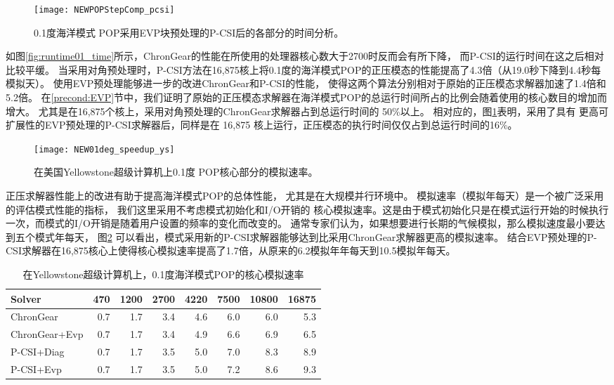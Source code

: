 \begin {figure}[!h]
\centering
\texttt{[image: NEWPOPStepComp\_pcsi]}
\caption[] { 0.1度海洋模式 POP采用EVP块预处理的P-CSI后的各部分的时间分析。 \label{fig:StepComp_pcsi}}
\end{figure}

如图\ref{fig:runtime01_time}所示，ChronGear的性能在所使用的处理器核心数大于2700时反而会有所下降，
而P-CSI的运行时间在这之后相对比较平缓。 
当采用对角预处理时，P-CSI方法在16,875核上将0.1度的海洋模式POP的正压模态的性能提高了4.3倍（从19.0秒下降到4.4秒每模拟天）。 
使用EVP预处理能够进一步的改进ChronGear和P-CSI的性能， 使得这两个算法分别相对于原始的正压模态求解器加速了1.4倍和5.2倍。
在\ref{precond:EVP}节中，我们证明了原始的正压模态求解器在海洋模式POP的总运行时间所占的比例会随着使用的核心数目的增加而增大。
尤其是在16,875个核上，采用对角预处理的ChronGear求解器占到总运行时间的 50\%以上。 
相对应的，图\ref{fig:StepComp_pcsi}表明，采用了具有 更高可扩展性的EVP预处理的P-CSI求解器后，同样是在 16,875 核上运行，正压模态的执行时间仅仅占到总运行时间的16\%。 

 
\begin {figure}[!h]
\centering
\texttt{[image: NEW01deg\_speedup\_ys]}
\caption []{在美国Yellowstone超级计算机上0.1度 POP核心部分的模拟速率。\label {fig:runtime01_rate}}
\end {figure}
正压求解器性能上的改进有助于提高海洋模式POP的总体性能， 尤其是在大规模并行环境中。
模拟速率（模拟年每天）是一个被广泛采用的评估模式性能的指标， 我们这里采用不考虑模式初始化和I/O开销的 核心模拟速率。这是由于模式初始化只是在模式运行开始的时候执行一次，而模式的I/O开销是随着用户设置的频率的变化而改变的。 
通常专家们认为，如果想要进行长期的气候模拟，那么模拟速度最小要达到五个模式年每天\cite{dennis2012computational}， 图\ref{fig:runtime01_rate} 可以看出，模式采用新的P-CSI求解器能够达到比采用ChronGear求解器更高的模拟速率。 
结合EVP预处理的P-CSI求解器在16,875核心上使得核心模拟速率提高了1.7倍，从原来的6.2模拟年年每天到10.5模拟年每天。 
 
\begin{table}
\begin{center}
\caption {在Yellowstone超级计算机上，0.1度海洋模式POP的核心模拟速率\label{tab:improve_01}}
\begin{tabular}{|l||r|r|r|r|r|r|r|}
\hline
Solver & 470  & 1200   & 2700 & 4220 & 7500 & 10800 & 16875\\\hline
\hline
ChronGear     &0.7 &1.7&3.4  &4.6 &6.0 &6.0 &5.3\\\hline
ChronGear+Evp &0.7 &1.7&3.4  &4.9 &6.6 &6.9 &6.5\\\hline
P-CSI+Diag    &0.7 &1.7&3.5  &5.0 &7.0 &8.3 &8.9\\\hline
P-CSI+Evp     &0.7 &1.7&3.5  &5.0 &7.2 &8.6 &9.3\\
\hline
\end{tabular}
\end{center}
\end{table}

